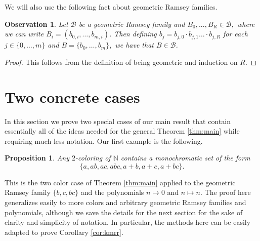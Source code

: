 \documentclass[10pt,a4paper]{article}
\newtheorem{proposition}[theorem]{Proposition}
\newtheorem{observation}[theorem]{Observation}
\theoremstyle{definition}
\begin{document}
We will also use the following fact about geometric Ramsey families.

\begin{observation}\label{obs tech}
    Let $\mathcal{B}$ be a geometric Ramsey family and $B_0,...,B_R\in\mathcal{B},$ where we can write $B_i=(b_{0,i},\ldots,b_{m,i})$.  Then defining $b_j=b_{j,0}\cdot b_{j,1}\ldots\cdot b_{j,R}$ for each $j\in \{0,\ldots,m\}$ and $B=\{b_0,\ldots,b_m\},$ we have that $B\in \mathcal{B}$.
\end{observation}

\begin{proof}
    This follows from the definition of being geometric and induction on $R.$ 
    \end{proof}

\section{Two concrete cases}\label{concrete}

In this section we prove two special cases of our main result that contain essentially all of the ideas needed for the general Theorem \ref{thm:main} while requiring much less notation.  Our first example is the following.

\begin{proposition}\label{geom2}
Any $2$-coloring of $\mathbb{N}$ contains a monochromatic set of the form $$\{a,ab,ac,abc, a+b,a+c,a+bc\}.$$
\end{proposition}

This is the two color case of Theorem \ref{thm:main} applied to the geometric Ramsey family $\{b,c,bc\}$ and the polynomials $n\mapsto 0$ and $n\mapsto n$.  The proof here generalizes easily to more colors and arbitrary geometric Ramsey families and polynomials, although we save the details for the next section for the sake of clarity and simplicity of notation.  In particular, the methods here can be easily adapted to prove Corollary \ref{cor:kmrr}.
\end{document}
